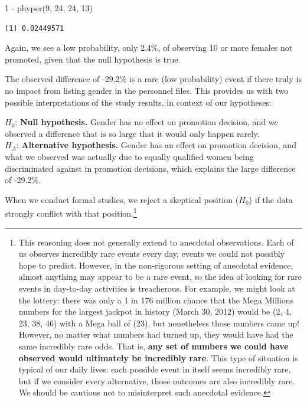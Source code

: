 \documentclass[
  letterpaper,
  DIV=11,
  numbers=noendperiod]{scrreprt}
\newenvironment{Shaded}{\begin{snugshade}}{\end{snugshade}}
\newcommand{\DecValTok}[1]{\textcolor[rgb]{0.68,0.00,0.00}{#1}}
\newcommand{\FunctionTok}[1]{\textcolor[rgb]{0.28,0.35,0.67}{#1}}
\newcommand{\NormalTok}[1]{\textcolor[rgb]{0.00,0.23,0.31}{#1}}
\newcommand{\SpecialCharTok}[1]{\textcolor[rgb]{0.37,0.37,0.37}{#1}}
\begin{document}
\begin{Shaded}
\begin{Highlighting}[]
\DecValTok{1} \SpecialCharTok{{-}} \FunctionTok{phyper}\NormalTok{(}\DecValTok{9}\NormalTok{, }\DecValTok{24}\NormalTok{, }\DecValTok{24}\NormalTok{, }\DecValTok{13}\NormalTok{)}
\end{Highlighting}
\end{Shaded}

\begin{verbatim}
[1] 0.02449571
\end{verbatim}

Again, we see a low probability, only 2.4\%, of observing 10 or more
females not promoted, given that the null hypothesis is true.

The observed difference of -29.2\% is a rare (low probability) event if
there truly is no impact from listing gender in the personnel files.
This provides us with two possible interpretations of the study results,
in context of our hypotheses:

\(H_0\): \textbf{Null hypothesis.} Gender has no effect on promotion
decision, and we observed a difference that is so large that it would
only happen rarely.\\
\(H_A\): \textbf{Alternative hypothesis.} Gender has an effect on
promotion decision, and what we observed was actually due to equally
qualified women being discriminated against in promotion decisions,
which explains the large difference of -29.2\%.

When we conduct formal studies, we reject a skeptical position (\(H_0\))
if the data strongly conflict with that position.\footnote{This
  reasoning does not generally extend to anecdotal observations. Each of
  us observes incredibly rare events every day, events we could not
  possibly hope to predict. However, in the non-rigorous setting of
  anecdotal evidence, almost anything may appear to be a rare event, so
  the idea of looking for rare events in day-to-day activities is
  treacherous. For example, we might look at the lottery: there was only
  a 1 in 176 million chance that the Mega Millions numbers for the
  largest jackpot in history (March 30, 2012) would be (2, 4, 23, 38,
  46) with a Mega ball of (23), but nonetheless those numbers came up!
  However, no matter what numbers had turned up, they would have had the
  same incredibly rare odds. That is, \textbf{any set of numbers we
  could have observed would ultimately be incredibly rare}. This type of
  situation is typical of our daily lives: each possible event in itself
  seems incredibly rare, but if we consider every alternative, those
  outcomes are also incredibly rare. We should be cautious not to
  misinterpret such anecdotal evidence.}
\end{document}
